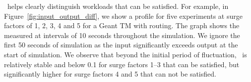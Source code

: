 




\maxiodiff\ helps clearly distinguish workloads that can be satisfied. For example, in Figure~\ref{fig:input_output_diff}, we show a \maxiodiff{} profile for five experiments at surge factors of 1, 2, 3, 4 and 5 for a Geant TM with \invcap{} routing.  The graph shows the \maxiodiff{} measured at intervals of 10 seconds throughout the simulation.
We ignore the first 50 seconds of simulation as the input significantly exceeds output at the start of simulation. We observe that beyond the initial period of fluctuation, \maxiodiff\ is relatively stable and below 0.1 for surge factors 1--3 that can be satisfied, but significantly higher for surge factors 4 and 5 that can not be satisfied.


